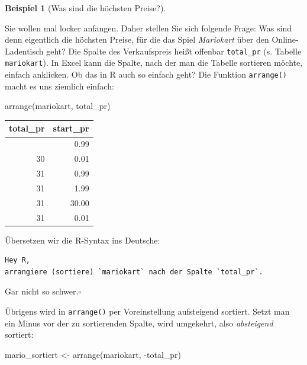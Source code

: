 \documentclass[
  a4paper,
  DIV=11]{scrreprt}
\newenvironment{Shaded}{\begin{snugshade}}{\end{snugshade}}
\newcommand{\FunctionTok}[1]{\textcolor[rgb]{0.28,0.35,0.67}{#1}}
\newcommand{\NormalTok}[1]{\textcolor[rgb]{0.00,0.23,0.31}{#1}}
\newcommand{\OtherTok}[1]{\textcolor[rgb]{0.00,0.23,0.31}{#1}}
\newcommand{\SpecialCharTok}[1]{\textcolor[rgb]{0.37,0.37,0.37}{#1}}
\theoremstyle{definition}
\theoremstyle{definition}
\newtheorem{example}{Beispiel}[chapter]
\theoremstyle{definition}
\theoremstyle{remark}
\begin{document}
\begin{example}[Was sind die höchsten
Preise?]\protect\hypertarget{exm-arrange1}{}\label{exm-arrange1}

Sie wollen mal locker anfangen. Daher stellen Sie sich folgende Frage:
Was sind denn eigentlich die höchsten Preise, für die das Spiel
\emph{Mariokart} über den Online-Ladentisch geht? Die Spalte des
Verkaufspreis heißt offenbar \texttt{total\_pr} (s. Tabelle
\texttt{mariokart}). In Excel kann die Spalte, nach der man die Tabelle
sortieren möchte, einfach anklicken. Ob das in R auch so einfach geht?
Die Funktion \texttt{arrange()} macht es uns ziemlich einfach:

\begin{Shaded}
\begin{Highlighting}[]
\FunctionTok{arrange}\NormalTok{(mariokart, total\_pr) }
\end{Highlighting}
\end{Shaded}

\begin{longtable}[]{@{}rr@{}}
\toprule\noalign{}
total\_pr & start\_pr \\
\midrule\noalign{}
\endhead
\bottomrule\noalign{}
\endlastfoot
29 & 0.99 \\
30 & 0.01 \\
31 & 0.99 \\
31 & 1.99 \\
31 & 30.00 \\
31 & 0.01 \\
\end{longtable}

Übersetzen wir die R-Syntax ins Deutsche:

\begin{verbatim}
Hey R,
arrangiere (sortiere) `mariokart` nach der Spalte `total_pr`.
\end{verbatim}

Gar nicht so schwer.\(\square\)

\end{example}

Übrigens wird in \texttt{arrange()} per Voreinstellung aufsteigend
sortiert. Setzt man ein Minus vor der zu sortierenden Spalte, wird
umgekehrt, also \emph{absteigend} sortiert:

\begin{Shaded}
\begin{Highlighting}[]
\NormalTok{mario\_sortiert }\OtherTok{\textless{}{-}} \FunctionTok{arrange}\NormalTok{(mariokart, }\SpecialCharTok{{-}}\NormalTok{total\_pr)}
\end{Highlighting}
\end{Shaded}
\end{document}
